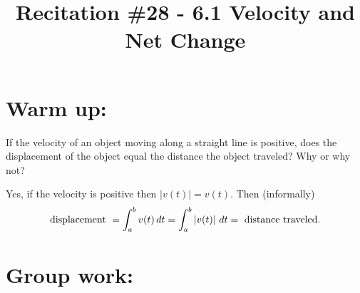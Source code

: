 \documentclass[handout,nooutcomes]{ximera}
\title{Recitation \#28 - 6.1 Velocity and Net Change}
\begin{document}
\begin{abstract}		\end{abstract}
\maketitle

\section*{Warm up:} 
If the velocity of an object moving along a straight line is positive, does the displacement of the object equal the distance the object traveled?  Why or why not?
		\begin{freeResponse}
		Yes, if the velocity is positive then $\left| v(t) \right|=v(t)$.  Then (informally)
			\begin{equation*}
			\text{displacement } = \int_a^b v(t) \,d t = \int_a^b \left| v(t) \right| \,d t = \text{ distance traveled}.
			\end{equation*}
		\end{freeResponse}	
		
		
		

	
	
	
	
	

\section*{Group work:}
\end{document}
